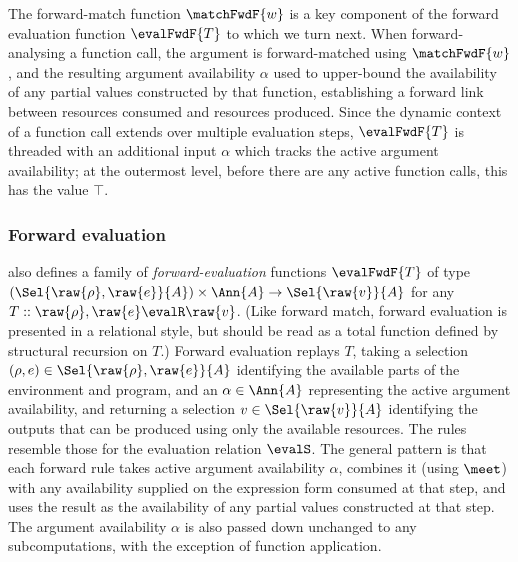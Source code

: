 The forward-match function $\matchFwdF{w}$ is a key component of the forward evaluation function $\evalFwdF{T}$ to which we turn next. When forward-analysing a function call, the argument is forward-matched using $\matchFwdF{w}$, and the resulting argument availability $\alpha$ used to upper-bound the availability of any partial values constructed by that function, establishing a forward link between resources consumed and resources produced. Since the dynamic context of a function call extends over multiple evaluation steps, $\evalFwdF{T}$ is threaded with an additional input $\alpha$ which tracks the active argument availability; at the outermost level, before there are any active function calls, this has the value $\top$.

\subsubsection{Forward evaluation}
\label{sec:data-dependencies:forward-eval}

 also defines a family of \emph{forward-evaluation} functions $\evalFwdF{T}$ of type $(\Sel{\raw{\rho}, \raw{e}}{A}) \times \Ann{A} \to \Sel{\raw{v}}{A}$ for any $T :: \raw{\rho}, \raw{e} \evalR \raw{v}$. (Like forward match, forward evaluation is presented in a relational style, but should be read as a total function defined by structural recursion on $T$.) Forward evaluation replays $T$, taking a selection $(\rho, e) \in \Sel{\raw{\rho}, \raw{e}}{A}$ identifying the available parts of the environment and program, and an $\alpha \in \Ann{A}$ representing the active argument availability, and returning a selection $v \in \Sel{\raw{v}}{A}$ identifying the outputs that can be produced using only the available resources. The rules resemble those for the evaluation relation $\evalS$. The general pattern is that each forward rule takes active argument availability $\alpha$, combines it (using $\meet$) with any availability supplied on the expression form consumed at that step, and uses the result as the availability of any partial values constructed at that step. The argument availability $\alpha$ is also passed down unchanged to any subcomputations, with the exception of function application.

